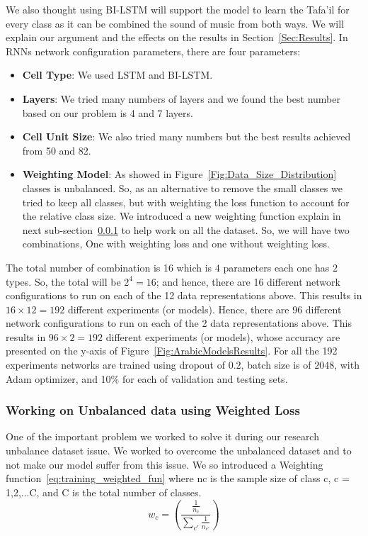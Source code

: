 We also thought using BI-LSTM will support the model to learn the Tafa'il for every class as it can be combined the sound of music from both ways. We will explain our argument and the effects on the results in Section~\ref{Sec:Results}.
In RNNs network configuration parameters, there are four parameters:
\begin{itemize}
 \item \textbf{Cell Type}: We used LSTM and BI-LSTM.
 \item \textbf{Layers}: We tried many numbers of layers and we found the best number based on our problem is 4 and 7 layers.
 \item \textbf{Cell Unit Size}: We also tried many numbers but the best results achieved from 50 and 82.
 \item \textbf{Weighting Model}: As showed in Figure~\ref{Fig:Data_Size_Distribution} classes is unbalanced. So, as an alternative to remove the small classes we tried to keep all classes, but with weighting the loss function to account for the relative class size. We introduced a new weighting function explain in next sub-section~\ref{Sec:W_Loss} to help work on all the dataset. So, we will have two combinations, One with weighting loss and one without weighting loss.
 
\end{itemize}

The total number of combination is 16 which is $4$ parameters each one has $2$ types. So, the total will be $2^4=16$; and hence, there are 16 different network configurations to run on each of the 12 data representations above. This results in $16 \times 12 = 192$ different experiments (or models). Hence, there are 96 different network configurations to run on each of the 2 data representations above. This results in $96 \times 2 = 192$ different experiments (or models), whose accuracy are presented on the y-axis of Figure~\ref{Fig:ArabicModelsResults}. For all the 192 experiments networks are trained using dropout of $0.2$, batch size is of $2048$, with Adam optimizer, and 10\% for each of validation and testing sets.


\subsubsection{Working on Unbalanced data using Weighted Loss}\label{Sec:W_Loss}

One of the important problem we worked to solve it during our research unbalance dataset issue. We worked to overcome the unbalanced dataset and to not make our model suffer from this issue. We so introduced a Weighting function~\ref{eq:training_weighted_fun} where nc is the sample size of class c, c = 1,2,...C, and C is the total number of classes.%
\begin{equation}\label{eq:training_weighted_fun}
 w_c = \left(\frac{\frac{1}{n_c}}{\sum_{c'} \frac{1}{n_{c'}}} \right)
\end{equation}

